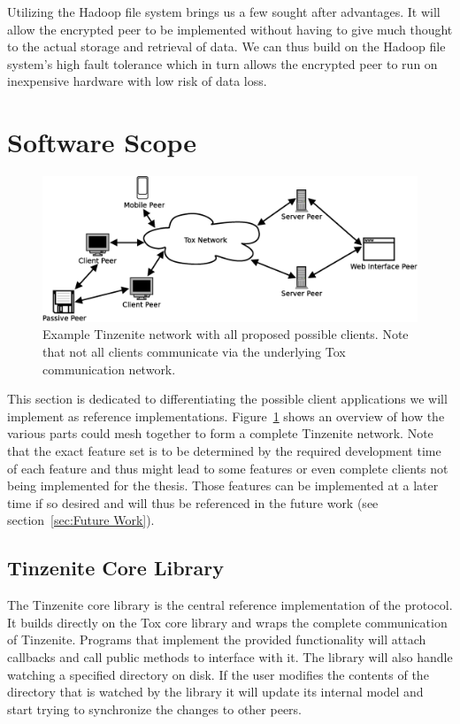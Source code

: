 Utilizing the Hadoop file system brings us a few sought after advantages.
It will allow the encrypted peer to be implemented without having to give much thought to the actual storage and retrieval of data.
We can thus build on the Hadoop file system's high fault tolerance which in turn allows the encrypted peer to run on inexpensive hardware with low risk of data loss.

\section{Software Scope}
\label{sec:Software Scope}

\begin{figure}[htp]
\centering
    \includegraphics[width=12cm]{diagram/topo_software}
\caption[Tinzenite Software Diagram]{Example Tinzenite network with all proposed possible clients. Note that not all clients communicate via the underlying Tox communication network.}
\label{fig:software}
\end{figure}

This section is dedicated to differentiating the possible client applications we will implement as reference implementations.
Figure~\ref{fig:software} shows an overview of how the various parts could mesh together to form a complete Tinzenite network.
Note that the exact feature set is to be determined by the required development time of each feature and thus might lead to some features or even complete clients not being implemented for the thesis.
Those features can be implemented at a later time if so desired and will thus be referenced in the future work (see section~\ref{sec:Future Work}).

\subsection{Tinzenite Core Library}
\label{sub:Tinzenite Core Library}

The Tinzenite core library is the central reference implementation of the protocol.
It builds directly on the Tox core library and wraps the complete communication of Tinzenite.
Programs that implement the provided functionality will attach callbacks and call public methods to interface with it.
The library will also handle watching a specified directory on disk.
If the user modifies the contents of the directory that is watched by the library it will update its internal model and start trying to synchronize the changes to other peers.

